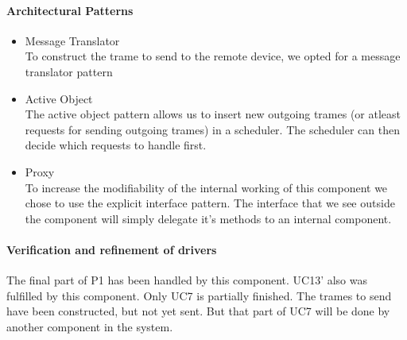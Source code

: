 \paragraph{Architectural Patterns}
\begin{itemize}
	\item Message Translator \\
	To construct the trame to send to the remote device, we opted for
		a message translator pattern
	\item Active Object \\
	The active object pattern allows us to insert new outgoing trames (or atleast
		requests for sending outgoing trames) in a scheduler. The scheduler can
		then decide which requests to handle first.
	\item Proxy \\
	To increase the modifiability of the internal working of this component we chose
		to use the explicit interface pattern. The interface that we see outside the
		component will simply delegate it's methods to an internal component.
\end{itemize}


\paragraph{Verification and refinement of drivers}
The final part of P1 has been handled by this component. UC13' also was fulfilled by this component.
Only UC7 is partially finished. The trames to send have been constructed, but not yet sent. But
that part of UC7 will be done by another component in the system.

